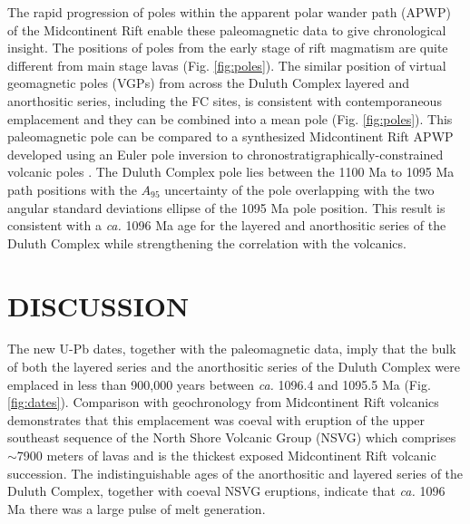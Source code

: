 \documentclass[11pt,letterpaper]{article}
\begin{document}
The rapid progression of poles within the apparent polar wander path (APWP) of the Midcontinent Rift enable these paleomagnetic data to give chronological insight. The positions of poles from the early stage of rift magmatism are quite different from main stage lavas (Fig. \ref{fig:poles}). The similar position of virtual geomagnetic poles (VGPs) from across the Duluth Complex layered and anorthositic series, including the FC sites, is consistent with contemporaneous emplacement and they can be combined into a mean pole (Fig. \ref{fig:poles}). This paleomagnetic pole can be compared to a synthesized Midcontinent Rift APWP developed using an Euler pole inversion to chronostratigraphically-constrained volcanic poles \citep{Swanson-Hysell2019a}. The Duluth Complex pole lies  between the 1100 Ma to 1095 Ma path positions with the $A_{95}$ uncertainty of the pole overlapping with the two angular standard deviations ellipse of the 1095 Ma pole position. This result is consistent with a \textit{ca.} 1096 Ma age for the layered and anorthositic series of the Duluth Complex while strengthening the correlation with the volcanics.


\section*{DISCUSSION}

The new U-Pb dates, together with the paleomagnetic data, imply that the bulk of both the layered series and the anorthositic series of the Duluth Complex were emplaced in less than 900,000 years between \textit{ca.} 1096.4 and 1095.5 Ma (Fig. \ref{fig:dates}). Comparison with geochronology from Midcontinent Rift volcanics demonstrates that this emplacement was coeval with eruption of the upper southeast sequence of the North Shore Volcanic Group (NSVG) which comprises $\sim$7900 meters of lavas and is the thickest exposed Midcontinent Rift volcanic succession. The indistinguishable ages of the anorthositic and layered series of the Duluth Complex, together with coeval NSVG eruptions, indicate that \textit{ca.} 1096 Ma there was a large pulse of melt generation. 

\end{document}
